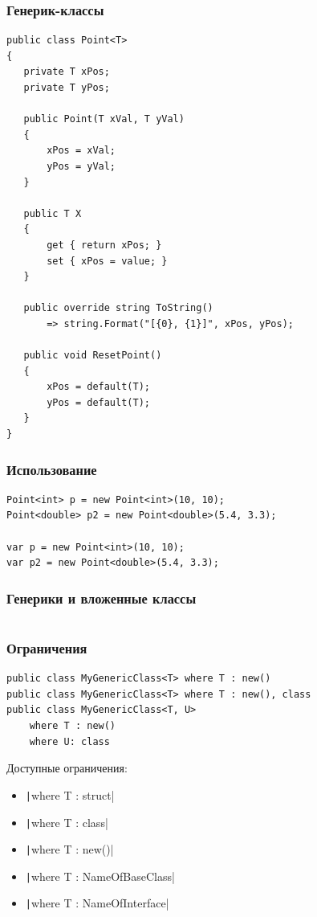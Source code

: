 \documentclass[xetex,mathserif,serif]{beamer}
\begin{document}
	\begin{frame}[fragile]
		\frametitle{Генерик-классы}
		\begin{tiny}
			\begin{verbatim}
public class Point<T>
{
   private T xPos;
   private T yPos;

   public Point(T xVal, T yVal)
   {
       xPos = xVal;
       yPos = yVal;
   }
   
   public T X
   {
       get { return xPos; }
       set { xPos = value; }
   }

   public override string ToString()
       => string.Format("[{0}, {1}]", xPos, yPos);

   public void ResetPoint()
   {
       xPos = default(T);
       yPos = default(T);
   }
}
			\end{verbatim}
		\end{tiny}
	\end{frame}

	\begin{frame}[fragile]
		\frametitle{Использование}
		\begin{verbatim}
Point<int> p = new Point<int>(10, 10);
Point<double> p2 = new Point<double>(5.4, 3.3);

var p = new Point<int>(10, 10);
var p2 = new Point<double>(5.4, 3.3);
		\end{verbatim}
	\end{frame}

	\begin{frame}[fragile]
		\frametitle{Генерики и вложенные классы}
		\center{\textcolor{red}{TODO}}
		\begin{verbatim}
		\end{verbatim}
	\end{frame}

	\begin{frame}[fragile]
		\frametitle{Ограничения}
		\begin{verbatim}
public class MyGenericClass<T> where T : new()
public class MyGenericClass<T> where T : new(), class
public class MyGenericClass<T, U> 
    where T : new() 
    where U: class
		\end{verbatim}

		Доступные ограничения:
		\begin{itemize}
			\item \texttt|where T : struct|
			\item \texttt|where T : class|
			\item \texttt|where T : new()|
			\item \texttt|where T : NameOfBaseClass|
			\item \texttt|where T : NameOfInterface|
		\end{itemize}
	\end{frame}
\end{document}
